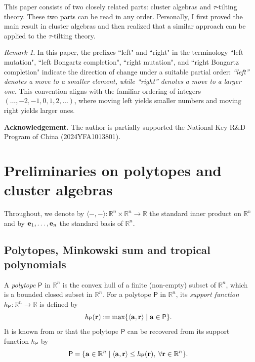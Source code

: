 \documentclass[10pt]{amsart}
\theoremstyle{definition}
\theoremstyle{remark}
\newtheorem{remark}[theorem]{Remark}
\numberwithin{equation}{section}
\begin{document}
This paper consists of two closely related parts: cluster algebras and $\tau$-tilting theory. These two parts can be read in any order. Personally, I first proved the main result in cluster algebras and then realized that a similar approach can be applied to the $\tau$-tilting theory.

\begin{remark}
In this paper, the prefixes ``left" and ``right" in the terminology ``left mutation", ``left Bongartz completion", ``right mutation",  and ``right Bongartz completion" indicate the direction of change under a suitable partial order: {\em ``left” denotes a move to a smaller element, while ``right” denotes a move to a larger one.} This convention aligns with the familiar ordering of integers $(\dots,-2,-1,0,1,2,\ldots)$, where moving left yields smaller numbers and moving right yields larger ones.
\end{remark}


 {\bf Acknowledgement.} 
 The author is partially supported the National Key R\&D Program of China (2024YFA1013801).

\section{Preliminaries on polytopes and cluster algebras}
Throughout, we denote by $\langle{-,-}\rangle:\mathbb R^n\times \mathbb R^n\to \mathbb R$ the standard inner product on $\mathbb R^n$ and by ${\bf e}_1,\ldots,{\bf e}_n$ the standard basis of $\mathbb R^n$.



\subsection{Polytopes, Minkowski sum and tropical polynomials}
A {\em polytope} $\mathsf P$ in $\mathbb R^n$ is the convex hull of a finite (non-empty)
subset of $\mathbb R^n$, which is a bounded closed subset in $\mathbb R^n$. For a polytope  $\mathsf P$ in $\mathbb R^n$, its {\em support function} $h_{\mathsf P}:\mathbb R^n\to \mathbb R$ is defined by
\[ h_{\mathsf P}({\bf r}):=\max\{ \langle{{\bf a},{\bf r}}\rangle\mid {\bf a}\in\mathsf P\}.\]
It is known from \cite[Section 4.2]{BK-2012} or \cite[Section 1.7]{Schneider_2013} that the polytope $\mathsf P$ can be recovered from its support function $h_{\mathsf P}$ by 
\[ \mathsf P=\{{\bf a}\in\mathbb R^n\mid \langle{{\bf a},{\bf r}}\rangle\leq h_{\mathsf P}({\bf r}),\;\forall {\bf r}\in\mathbb R^n\}.\]
\end{document}
